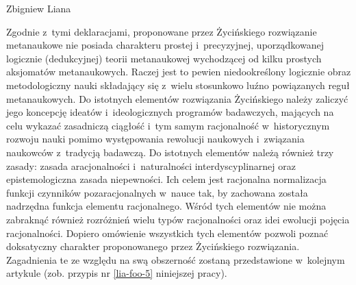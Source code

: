 \begin{artplenv}{Zbigniew Liana}

Zgodnie z~tymi deklaracjami, proponowane przez Życińskiego rozwiązanie metanaukowe nie posiada charakteru
prostej i~precyzyjnej, uporządkowanej logicznie (dedukcyjnej) teorii metanaukowej wychodzącej od kilku prostych aksjomatów
metanaukowych. Raczej jest to pewien niedookreślony logicznie obraz metodologiczny nauki składający się z~wielu
stosunkowo luźno powiązanych reguł metanaukowych. Do istotnych elementów rozwiązania Życińskiego należy zaliczyć jego
koncepcję ideatów i~ideologicznych programów badawczych, mających na celu wykazać zasadniczą ciągłość i~tym samym
racjonalność w~historycznym rozwoju nauki pomimo występowania rewolucji naukowych i~związania naukowców z~tradycją
badawczą. Do istotnych elementów należą również trzy zasady: zasada aracjonalności i~naturalności interdyscyplinarnej
oraz epistemologiczna zasada niepewności. Ich celem jest racjonalna normalizacja funkcji czynników
pozaracjonalnych w~nauce tak, by zachowana została nadrzędna funkcja elementu racjonalnego.
Wśród tych elementów nie można zabraknąć
również rozróżnień wielu typów racjonalności oraz idei ewolucji pojęcia racjonalności. Dopiero omówienie wszystkich
tych elementów pozwoli poznać doksatyczny charakter proponowanego przez Życińskiego rozwiązania. Zagadnienia te ze
względu na swą obszerność zostaną przedstawione w~kolejnym artykule (zob. przypis nr \ref{lia-foo-5} niniejszej pracy).


\end{artplenv}
